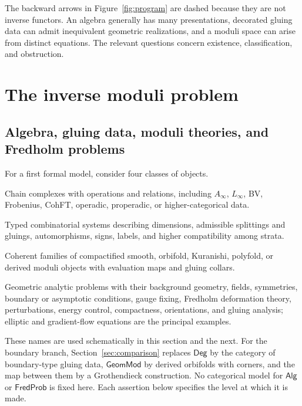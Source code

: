 \documentclass[11pt,letterpaper,twoside]{article}
\theoremstyle{plain}
\theoremstyle{definition}
\theoremstyle{remark}
\newcommand{\Alg}{\mathsf{Alg}}
\newcommand{\Deg}{\mathsf{Deg}}
\newcommand{\GeomMod}{\mathsf{GeomMod}}
\newcommand{\FredProb}{\mathsf{FredProb}}
\newcommand{\Ainf}{A_\infty}
\begin{document}
The backward arrows in Figure~\ref{fig:program} are dashed because they are not inverse functors.  An algebra generally has many presentations, decorated gluing data can admit inequivalent geometric realizations, and a moduli space can arise from distinct equations.  The relevant questions concern existence, classification, and obstruction.

\section{The inverse moduli problem}\label{sec:formal}

\subsection{Algebra, gluing data, moduli theories, and Fredholm problems}

For a first formal model, consider four classes of objects.
\begin{description}[leftmargin=2.6cm,style=nextline]
\item[\(\Alg\)] Chain complexes with operations and relations, including \(\Ainf\), \(L_\infty\), BV, Frobenius, CohFT, operadic, properadic, or higher-categorical data.
\item[\(\Deg\)] Typed combinatorial systems describing dimensions, admissible splittings and gluings, automorphisms, signs, labels, and higher compatibility among strata.
\item[\(\GeomMod\)] Coherent families of compactified smooth, orbifold, Kuranishi, polyfold, or derived moduli objects with evaluation maps and gluing collars.
\item[\(\FredProb\)] Geometric analytic problems with their background geometry, fields, symmetries, boundary or asymptotic conditions, gauge fixing, Fredholm deformation theory, perturbations, energy control, compactness, orientations, and gluing analysis; elliptic and gradient-flow equations are the principal examples.
\end{description}

These names are used schematically in this section and the next.  For the boundary branch, Section~\ref{sec:comparison} replaces \(\Deg\) by the category of boundary-type gluing data, \(\GeomMod\) by derived orbifolds with corners, and the map between them by a Grothendieck construction.  No categorical model for \(\Alg\) or \(\FredProb\) is fixed here.  Each assertion below specifies the level at which it is made.
\end{document}
